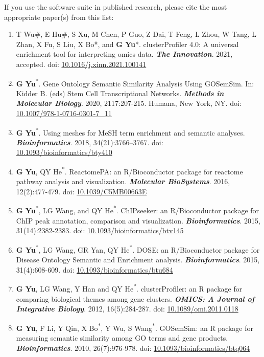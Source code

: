 \documentclass[
  12pt,
  a4paper,
  twoside]{book}
\providecommand{\tightlist}{%
  \setlength{\itemsep}{0pt}\setlength{\parskip}{0pt}}
\begin{document}
If you use the software suite in published research, please cite the most appropriate paper(s) from this list:

\begin{enumerate}
\def\labelenumi{\arabic{enumi}.}
\tightlist
\item
  T Wu\#, E Hu\#, S Xu, M Chen, P Guo, Z Dai, T Feng, L Zhou, W Tang, L Zhan, X Fu, S Liu, X Bo*, and \textbf{G Yu}*. clusterProfiler 4.0: A universal enrichment tool for interpreting omics data. \textbf{\emph{The Innovation}}. 2021, accepted.
  doi: \href{https://doi.org/10.1016/j.xinn.2021.100141}{10.1016/j.xinn.2021.100141}
\item
  \textbf{G Yu}\textsuperscript{*}. Gene Ontology Semantic Similarity Analysis Using GOSemSim. In: Kidder B. (eds) Stem Cell Transcriptional Networks. \textbf{\emph{Methods in Molecular Biology}}. 2020, 2117:207-215. Humana, New York, NY.
  doi: \href{https://doi.org/10.1007/978-1-0716-0301-7_11}{10.1007/978-1-0716-0301-7\_11}
\item
  \textbf{G Yu}\textsuperscript{*}. Using meshes for MeSH term enrichment and semantic analyses. \textbf{\emph{Bioinformatics}}. 2018, 34(21):3766--3767.
  doi: \href{https://doi.org/10.1093/bioinformatics/bty410}{10.1093/bioinformatics/bty410}
\item
  \textbf{G Yu}, QY He\textsuperscript{*}. ReactomePA: an R/Bioconductor package for reactome pathway analysis and visualization. \textbf{\emph{Molecular BioSystems}}. 2016, 12(2):477-479.
  doi: \href{https://doi.org/10.1039/C5MB00663E}{10.1039/C5MB00663E}
\item
  \textbf{G Yu}\textsuperscript{*}, LG Wang, and QY He\textsuperscript{*}. ChIPseeker: an R/Bioconductor package for ChIP peak annotation, comparison and visualization. \textbf{\emph{Bioinformatics}}. 2015, 31(14):2382-2383.
  doi: \href{https://doi.org/10.1093/bioinformatics/btv145}{10.1093/bioinformatics/btv145}
\item
  \textbf{G Yu}\textsuperscript{*}, LG Wang, GR Yan, QY He\textsuperscript{*}. DOSE: an R/Bioconductor package for Disease Ontology Semantic and Enrichment analysis. \textbf{\emph{Bioinformatics}}. 2015, 31(4):608-609.
  doi: \href{https://doi.org/10.1093/bioinformatics/btu684}{10.1093/bioinformatics/btu684}
\item
  \textbf{G Yu}, LG Wang, Y Han and QY He\textsuperscript{*}. clusterProfiler: an R package for comparing biological themes among gene clusters. \textbf{\emph{OMICS: A Journal of Integrative Biology}}. 2012, 16(5):284-287.
  doi: \href{https://doi.org/10.1089/omi.2011.0118}{10.1089/omi.2011.0118}
\item
  \textbf{G Yu}, F Li, Y Qin, X Bo\textsuperscript{*}, Y Wu, S Wang\textsuperscript{*}. GOSemSim: an R package for measuring semantic similarity among GO terms and gene products. \textbf{\emph{Bioinformatics}}. 2010, 26(7):976-978.
  doi: \href{https://doi.org/10.1093/bioinformatics/btq064}{10.1093/bioinformatics/btq064}
\end{enumerate}
\end{document}
